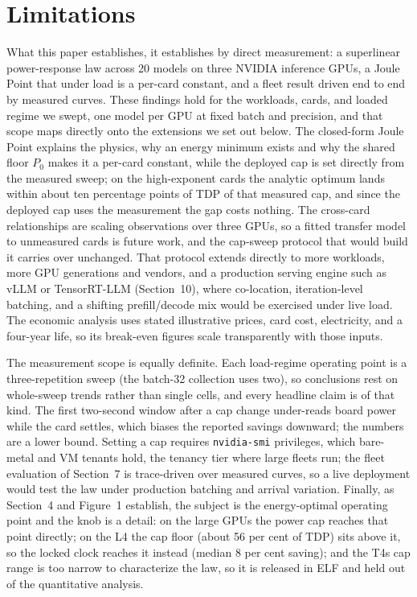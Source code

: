 \section*{Limitations}\label{limitations}

What this paper establishes, it establishes by direct measurement: a superlinear power-response law across 20 models on three NVIDIA inference GPUs, a Joule Point that under load is a per-card constant, and a fleet result driven end to end by measured curves. These findings hold for the workloads, cards, and loaded regime we swept, one model per GPU at fixed batch and precision, and that scope maps directly onto the extensions we set out below. The closed-form Joule Point explains the physics, why an energy minimum exists and why the shared floor {\(P_0\)} makes it a per-card constant, while the deployed cap is set directly from the measured sweep; on the high-exponent cards the analytic optimum lands within about ten percentage points of TDP of that measured cap, and since the deployed cap uses the measurement the gap costs nothing. The cross-card relationships are scaling observations over three GPUs, so a fitted transfer model to unmeasured cards is future work, and the cap-sweep protocol that would build it carries over unchanged. That protocol extends directly to more workloads, more GPU generations and vendors, and a production serving engine such as vLLM or TensorRT-LLM (Section~10), where co-location, iteration-level batching, and a shifting prefill/decode mix would be exercised under live load. The economic analysis uses stated illustrative prices, card cost, electricity, and a four-year life, so its break-even figures scale transparently with those inputs.

The measurement scope is equally definite. Each load-regime operating point is a three-repetition sweep (the batch-32 collection uses two), so conclusions rest on whole-sweep trends rather than single cells, and every headline claim is of that kind. The first two-second window after a cap change under-reads board power while the card settles, which biases the reported savings downward; the numbers are a lower bound. Setting a cap requires \texttt{nvidia-smi} privileges, which bare-metal and VM tenants hold, the tenancy tier where large fleets run; the fleet evaluation of Section~7 is trace-driven over measured curves, so a live deployment would test the law under production batching and arrival variation. Finally, as Section~4 and Figure~1 establish, the subject is the energy-optimal operating point and the knob is a detail: on the large GPUs the power cap reaches that point directly; on the L4 the cap floor (about 56 per cent of TDP) sits above it, so the locked clock reaches it instead (median 8 per cent saving); and the T4\textquotesingle s cap range is too narrow to characterize the law, so it is released in ELF and held out of the quantitative analysis.

